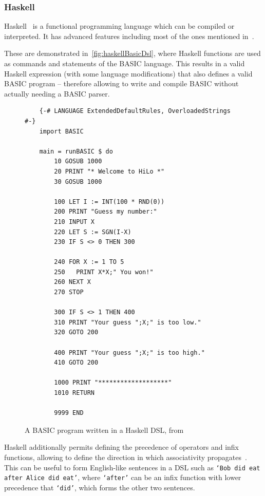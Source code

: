\subsubsection{Haskell}

Haskell~\cite{haskellDocs} is a functional programming language which can be compiled or interpreted.
It has advanced features including most of the ones mentioned in~.

These are demonstrated in~\autoref{fig:haskellBasicDsl}, where Haskell functions are used as commands and statements of the BASIC language.
This results in a valid Haskell expression (with some language modifications) that also defines a valid BASIC program -- therefore allowing to write and compile BASIC without actually needing a BASIC parser.

\begin{figure}[h]
    \centering
    \begin{minipage}{0.8\textwidth}
        \begin{verbatim}
    {-# LANGUAGE ExtendedDefaultRules, OverloadedStrings #-}
    import BASIC

    main = runBASIC $ do
        10 GOSUB 1000
        20 PRINT "* Welcome to HiLo *"
        30 GOSUB 1000

        100 LET I := INT(100 * RND(0))
        200 PRINT "Guess my number:"
        210 INPUT X
        220 LET S := SGN(I-X)
        230 IF S <> 0 THEN 300

        240 FOR X := 1 TO 5
        250   PRINT X*X;" You won!"
        260 NEXT X
        270 STOP

        300 IF S <> 1 THEN 400
        310 PRINT "Your guess ";X;" is too low."
        320 GOTO 200

        400 PRINT "Your guess ";X;" is too high."
        410 GOTO 200

        1000 PRINT "*******************"
        1010 RETURN

        9999 END
        \end{verbatim}
    \end{minipage}
    \caption[BASIC program written in a Haskell DSL]
    {A BASIC program written in a Haskell DSL, from~\cite{haskellBasicDSL}}
    \label{fig:haskellBasicDsl}
\end{figure}

Haskell additionally permits defining the precedence of operators and infix functions, allowing to define the direction in which associativity propagates~\cite{haskellFixity}.
This can be useful to form English-like sentences in a DSL such as \texttt{`Bob did eat after Alice did eat'}, where \texttt{`after'} can be an infix function with lower precedence that \texttt{`did'}, which forms the other two sentences.

